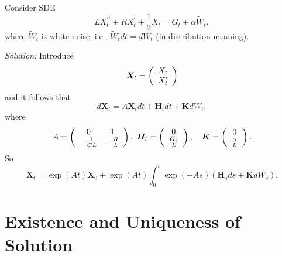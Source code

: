 \begin{exam}
    Consider SDE
    \begin{equation*}
        LX_t^{\prime\prime} + RX_t^\prime + \frac{1}{2}X_t = G_t + \alpha \tilde{W}_t,
    \end{equation*}
    where $\tilde{W}_t$ is white noise, i.e., $\tilde{W}_t dt = dW_t$ (in distribution meaning).

    \noindent \emph{Solution:} Introduce
    \begin{equation*}
         \bm{X}_t = \left(
            \begin{array}{c}
                X_t \\
                X_t^\prime
            \end{array}
        \right)
    \end{equation*}
    and it follows that
    \begin{equation*}
        d\bm{X}_t = A\bm{X}_t dt + \bm{H}_t dt + \bm{K} dW_t,
    \end{equation*}
    where
    \begin{equation*}
        A=\left(\begin{array}{cc}
            0 & 1 \\
            -\frac{1}{C L} & -\frac{R}{L}
        \end{array}\right),~\bm{H}_t = \left(
            \begin{array}{c}
                0 \\
                \frac{G_t}{L}
            \end{array}
        \right),\quad \bm{K} = \left(
            \begin{array}{c}
                0 \\
                \frac{\alpha}{L}
            \end{array}
        \right).
    \end{equation*}
    So
    \begin{equation*}
        \bm{X}_t=\exp (A t) \bm{X}_0+\exp (A t) \int_0^t \exp (-A s)\left(\bm{H}_s d s+\bm{K} d W_s\right).
    \end{equation*}
\end{exam}

\section{Existence and Uniqueness of Solution}


